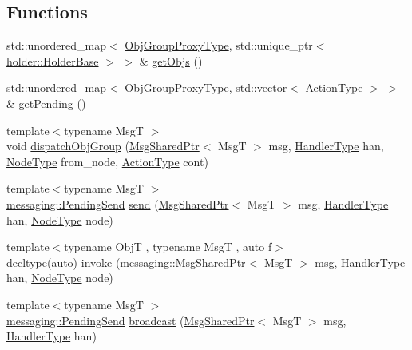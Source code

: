 \subsection*{Functions}
\begin{DoxyCompactItemize}
\item 
std\+::unordered\+\_\+map$<$ \hyperlink{namespacevt_ad7cae989df485fccca57f0792a880a8e}{Obj\+Group\+Proxy\+Type}, std\+::unique\+\_\+ptr$<$ \hyperlink{structvt_1_1objgroup_1_1holder_1_1_holder_base}{holder\+::\+Holder\+Base} $>$ $>$ \& \hyperlink{namespacevt_1_1objgroup_a51307ccb565eb0441ba64949c67031cb}{get\+Objs} ()
\item 
std\+::unordered\+\_\+map$<$ \hyperlink{namespacevt_ad7cae989df485fccca57f0792a880a8e}{Obj\+Group\+Proxy\+Type}, std\+::vector$<$ \hyperlink{namespacevt_ae0a5a7b18cc99d7b732cb4d44f46b0f3}{Action\+Type} $>$ $>$ \& \hyperlink{namespacevt_1_1objgroup_a0574ec1b0319596b2f2af0a107108390}{get\+Pending} ()
\item 
{\footnotesize template$<$typename MsgT $>$ }\\void \hyperlink{namespacevt_1_1objgroup_ad45be555d5ff3bd308e8f61e4e2dd909}{dispatch\+Obj\+Group} (\hyperlink{namespacevt_ab2b3d506ec8e8d1540aede826d84a239}{Msg\+Shared\+Ptr}$<$ MsgT $>$ msg, \hyperlink{namespacevt_af64846b57dfcaf104da3ef6967917573}{Handler\+Type} han, \hyperlink{namespacevt_a866da9d0efc19c0a1ce79e9e492f47e2}{Node\+Type} from\+\_\+node, \hyperlink{namespacevt_ae0a5a7b18cc99d7b732cb4d44f46b0f3}{Action\+Type} cont)
\item 
{\footnotesize template$<$typename MsgT $>$ }\\\hyperlink{structvt_1_1messaging_1_1_pending_send}{messaging\+::\+Pending\+Send} \hyperlink{namespacevt_1_1objgroup_a6efc2df6997b609c551848af332cfb15}{send} (\hyperlink{namespacevt_ab2b3d506ec8e8d1540aede826d84a239}{Msg\+Shared\+Ptr}$<$ MsgT $>$ msg, \hyperlink{namespacevt_af64846b57dfcaf104da3ef6967917573}{Handler\+Type} han, \hyperlink{namespacevt_a866da9d0efc19c0a1ce79e9e492f47e2}{Node\+Type} node)
\item 
{\footnotesize template$<$typename ObjT , typename MsgT , auto f$>$ }\\decltype(auto) \hyperlink{namespacevt_1_1objgroup_a93db5149930b07803d8cc987449baa66}{invoke} (\hyperlink{structvt_1_1messaging_1_1_msg_shared_ptr}{messaging\+::\+Msg\+Shared\+Ptr}$<$ MsgT $>$ msg, \hyperlink{namespacevt_af64846b57dfcaf104da3ef6967917573}{Handler\+Type} han, \hyperlink{namespacevt_a866da9d0efc19c0a1ce79e9e492f47e2}{Node\+Type} node)
\item 
{\footnotesize template$<$typename MsgT $>$ }\\\hyperlink{structvt_1_1messaging_1_1_pending_send}{messaging\+::\+Pending\+Send} \hyperlink{namespacevt_1_1objgroup_a1986e4cf0b0e869e44860cd1d98196e7}{broadcast} (\hyperlink{namespacevt_ab2b3d506ec8e8d1540aede826d84a239}{Msg\+Shared\+Ptr}$<$ MsgT $>$ msg, \hyperlink{namespacevt_af64846b57dfcaf104da3ef6967917573}{Handler\+Type} han)
\end{DoxyCompactItemize}


